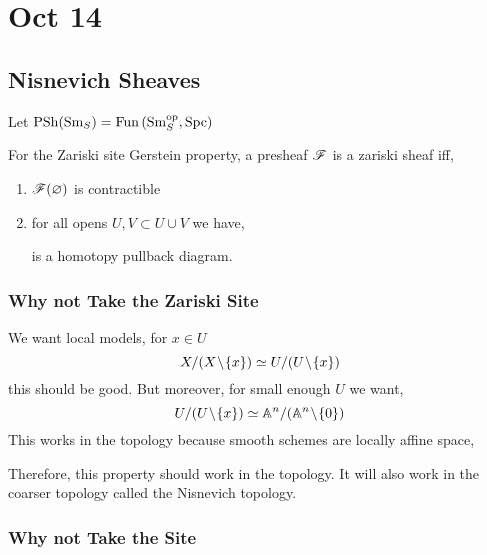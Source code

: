 \documentclass[12pt]{article}
\begin{document}
\section{Oct 14}


\subsection{Nisnevich Sheaves}

\newcommand{\Sm}{\mathrm{Sm}}
\newcommand{\Spc}{\mathrm{Spc}}
\newcommand{\PSh}{\mathrm{PSh}}
\newcommand{\pr}{\mathrm{pr}}

Let $\PSh(\Sm_S) = \Fun{\Sm_S^\op}{\Spc}$ 


For the Zariski site Gerstein property, a presheaf $\mathscr{F}$ is a zariski sheaf iff,
\begin{enumerate}
\item $\mathscr{F}(\varnothing)$ is contractible
\item for all opens $U, V \subset U \cup V$ we have,
\begin{center}
\end{center}
is a homotopy pullback diagram.
\end{enumerate}



\subsubsection{Why not Take the Zariski Site}

We want local models, for $x \in U$
\[ X / (X \! \setminus \! \{ x \}) \simeq U / (U \! \setminus \! \{ x \}) \]
this should be good. But moreover, for small enough $U$ we want,
\[ U / (U \! \setminus \! \{ x \}) \simeq \mathbb{A}^n / (\mathbb{A}^n \! \setminus \! \{ 0 \}) \]
This works in the \etale topology because smooth schemes are \etale locally affine space, 
\begin{center}
\end{center}
Therefore, this property should work in the \etale topology. It will also work in the coarser topology called the Nisnevich topology.

\subsubsection{Why not Take the \etale Site}
\end{document}
